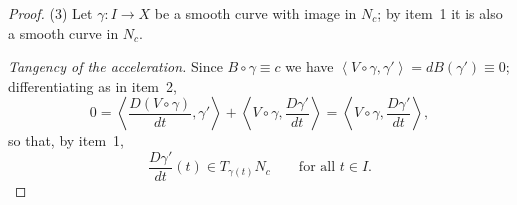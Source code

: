 \begin{proof}
(3) Let $\gamma\colon I\to X$ be a smooth curve with image in $N_c$; by
item~1 it is also a smooth curve in $N_c$.

\emph{Tangency of the acceleration.} Since $B\circ\gamma\equiv c$ we
have $\left\langle V\circ\gamma,\gamma'\right\rangle
=dB(\gamma')\equiv0$; differentiating as in item~2,
$$0=\left\langle\frac{D(V\circ\gamma)}{dt},\gamma'\right\rangle
+\left\langle V\circ\gamma,\frac{D\gamma'}{dt}\right\rangle
=\left\langle V\circ\gamma,\frac{D\gamma'}{dt}\right\rangle,$$
so that, by item~1,
\begin{equation}\label{eq:tangential-acceleration}
\frac{D\gamma'}{dt}(t)\in T_{\gamma(t)}N_c\qquad\text{for all }t\in I .
\end{equation}


\end{proof}
